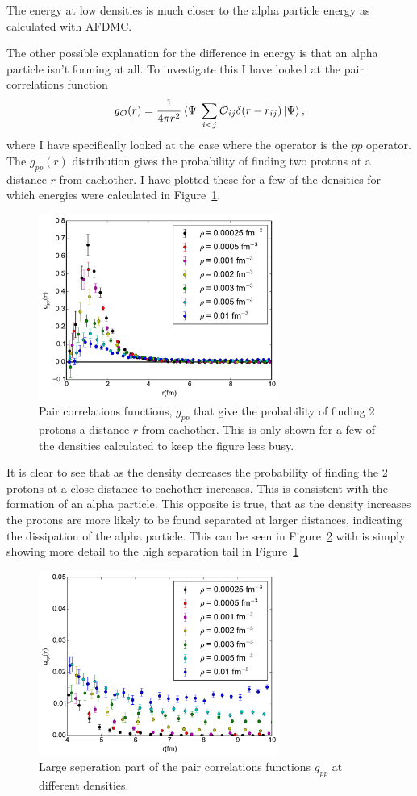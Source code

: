 The energy at low densities is much closer to the alpha particle energy as calculated with AFDMC.

The other possible explanation for the difference in energy is that an alpha particle isn't forming at all. To investigate this I have looked at the pair correlations function
\begin{equation}
   g_\mathcal{O}(r) = \frac{1}{4\pi r^2} \left< \Psi \right|\sum\limits_{i<j}\mathcal{O}_{ij}\delta(r-r_{ij})\left| \Psi \right>,
\end{equation}
where I have specifically looked at the case where the operator is the $pp$ operator. The $g_{pp}(r)$ distribution gives the probability of finding two protons at a distance $r$ from eachother. I have plotted these for a few of the densities for which energies were calculated in Figure~\ref{fig:gpp}.
\begin{figure}[h!]
   \centering
   \includegraphics[width=0.7\textwidth]{figures/gpp.pdf}
   \caption{Pair correlations functions, $g_{pp}$ that give the probability of finding 2 protons a distance $r$ from eachother. This is only shown for a few of the densities calculated to keep the figure less busy.}
   \label{fig:gpp}
\end{figure}
It is clear to see that as the density decreases the probability of finding the 2 protons at a close distance to eachother increases. This is consistent with the formation of an alpha particle. This opposite is true, that as the density increases the protons are more likely to be found separated at larger distances, indicating the dissipation of the alpha particle. This can be seen in Figure~\ref{fig:gpp_small} with is simply showing more detail to the high separation tail in Figure~\ref{fig:gpp}
\begin{figure}[h!]
   \centering
   \includegraphics[width=0.7\textwidth]{figures/gpp_small.pdf}
   \caption{Large seperation part of the pair correlations functions $g_{pp}$ at different densities.}
   \label{fig:gpp_small}
\end{figure}
